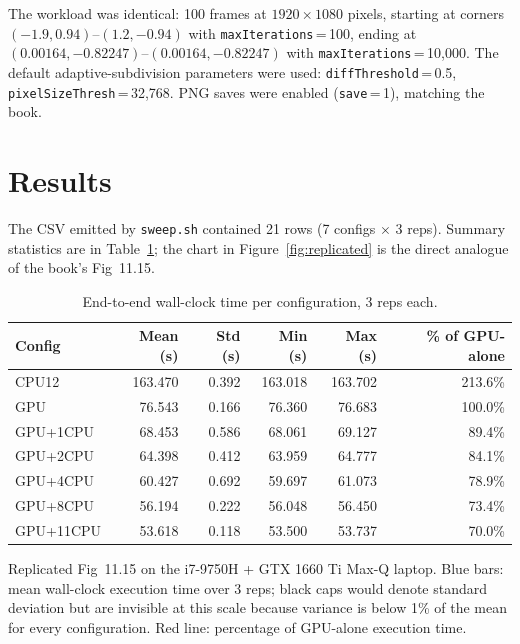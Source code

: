\documentclass[
	english,
	letterpaper, oneside
]{article}
\begin{document}
The workload was identical: 100 frames at $1920 \times 1080$ pixels,
starting at corners $(-1.9, 0.94)$--$(1.2, -0.94)$ with
\texttt{maxIterations}\,=\,100, ending at
$(0.00164, -0.82247)$--$(0.00164, -0.82247)$ with
\texttt{maxIterations}\,=\,10{,}000. The default adaptive-subdivision
parameters were used: \texttt{diffThreshold}\,=\,0.5,
\texttt{pixelSizeThresh}\,=\,32{,}768. PNG saves were enabled
(\texttt{save}\,=\,1), matching the book.

\section{Results}

The CSV emitted by \texttt{sweep.sh} contained 21 rows (7 configs $\times$
3 reps). Summary statistics are in Table~\ref{tab:results}; the chart in
Figure~\ref{fig:replicated} is the direct analogue of the book's
Fig~11.15.

\begin{table}[H]
    \centering
    \caption{End-to-end wall-clock time per configuration, 3 reps each.}
    \label{tab:results}
    \begin{tabular}{lrrrrr}
        \hline
        Config & Mean (s) & Std (s) & Min (s) & Max (s) & \% of GPU-alone \\
        \hline
        CPU12      & 163.470 & 0.392 & 163.018 & 163.702 & 213.6\% \\
        GPU        &  76.543 & 0.166 &  76.360 &  76.683 & 100.0\% \\
        GPU+1CPU   &  68.453 & 0.586 &  68.061 &  69.127 &  89.4\% \\
        GPU+2CPU   &  64.398 & 0.412 &  63.959 &  64.777 &  84.1\% \\
        GPU+4CPU   &  60.427 & 0.692 &  59.697 &  61.073 &  78.9\% \\
        GPU+8CPU   &  56.194 & 0.222 &  56.048 &  56.450 &  73.4\% \\
        GPU+11CPU  &  53.618 & 0.118 &  53.500 &  53.737 &  70.0\% \\
        \hline
    \end{tabular}
\end{table}

            {Replicated Fig~11.15 on the i7-9750H + GTX 1660 Ti Max-Q
             laptop.  Blue bars: mean wall-clock execution time over 3
             reps; black caps would denote standard deviation but are
             invisible at this scale because variance is below 1\% of
             the mean for every configuration.  Red line: percentage of
             GPU-alone execution time.  \label{fig:replicated}}
\end{document}
